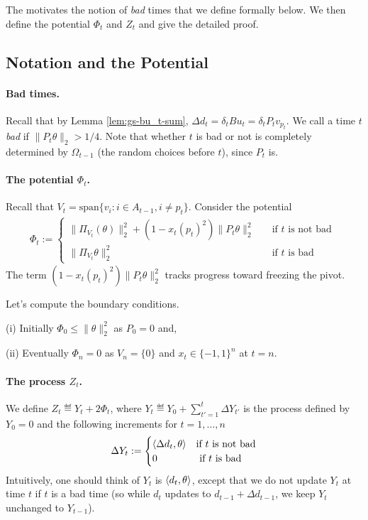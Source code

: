 The motivates the notion of {\em bad} times that we define formally below. We then define the potential $\Phi_t$ and $Z_t$ and give the  detailed proof.
\subsection{Notation and the Potential}
\paragraph{Bad times.}
Recall that by Lemma \ref{lem:gs-bu_t-sum}, $\Delta d_t= \delta_t Bu_t = \delta_t P_t v_{p_t}$.
We call a time $t$  {\em bad} if  $\|P_t\theta \|_2 > 1/4$.
Note that whether $t$ is bad or not is completely determined by
$\Omega_{t-1}$ (the random choices before $t$), since $P_t$ is.
\paragraph{The potential $\Phi_t$.} 
Recall that $V_t = \text{span}\{ v_i : i\in A_{t-1}, i\neq p_t\}$.
Consider the potential
\begin{align*} \Phi_t := 
\begin{cases}
        \|\Pi_{V_t} (\theta) \|_2^2 + (1-x_t(p_t)^2) \|P_t \theta \|_2^2
           \quad &  \text{if $t$ is not bad }\\
                \| \Pi_{V_t} \theta \|_2^2  \quad  &  \text{if $t$ is bad }
\end{cases}
\end{align*}
The term $(1-x_t(p_t)^2) \|P_t \theta \|_2^2$ tracks progress toward freezing the pivot.

Let's compute the boundary conditions. 
\smallskip

(i) Initially $\Phi_0 \leq \|\theta\|_2^2$ as $P_0=0$ and,

(ii) Eventually $\Phi_n =0$  as $V_n=\{0\}$ and $x_t\in \{-1,1\}^n$ at $t=n$.
\allowdisplaybreaks
\paragraph{The process $Z_t$.}
We define $Z_t \eqdef Y_t +  2\Phi_t$, where $Y_t \eqdef Y_0 + \sum_{t' =
  1}^t\Delta Y_{t'}$ is the process defined by $Y_0=0$ and the following increments for $t=1,\ldots,n$
\begin{align*}
\Delta Y_t := 
	\begin{cases}
			\langle \Delta d_t,\theta\rangle & \mbox{if }t \text{ is not bad} \\
		  0  & \text{ if $t$ is bad}
	\end{cases}
\end{align*}
Intuitively, one should think of $Y_t$ is $\langle d_t,\theta\rangle$, except that we do not update $Y_t$ at time $t$ if $t$ is a bad time (so while $d_t $ updates to $d_{t-1} + \Delta d_{t-1}$, we keep $Y_t$ unchanged to $Y_{t-1}$).

